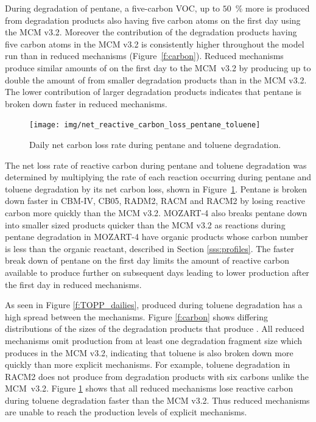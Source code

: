 During degradation of pentane, a five-carbon VOC, up to \mbox{$50$ \%} more  is produced from degradation products also having five carbon atoms on the first day using the MCM v3.2. 
Moreover the contribution of the degradation products having five carbon atoms in the MCM v3.2 is consistently higher throughout the model run than in reduced mechanisms \mbox{(Figure \ref{f:carbon}).}
Reduced mechanisms produce similar amounts of  on the first day to the \mbox{MCM v3.2} by producing up to double the amount of  from smaller degradation products than in the MCM v3.2.
The lower contribution of larger degradation products indicates that pentane is broken down faster in reduced mechanisms.

%
\begin{figure}
    \centering
    \texttt{[image: img/net\_reactive\_carbon\_loss\_pentane\_toluene]}
    \vspace{0mm}
    \caption{Daily net carbon loss rate during pentane and toluene degradation.}
    \vspace{-4mm}
    \label{f:net_carbon_loss}
\end{figure}
%
The net loss rate of reactive carbon during pentane and toluene degradation was determined by multiplying the rate of each reaction occurring during pentane and toluene degradation by its net carbon loss, shown in \mbox{Figure \ref{f:net_carbon_loss}}.
Pentane is broken down faster in CBM-IV, CB05, RADM2, RACM and RACM2 by losing reactive carbon more quickly than the MCM v3.2.
MOZART-4 also breaks pentane down into smaller sized products quicker than the MCM v3.2 as reactions during pentane degradation in MOZART-4 have organic products whose carbon number is less than the organic reactant, described in Section \ref{sss:profiles}.
The faster break down of pentane on the first day limits the amount of reactive carbon available to produce further  on subsequent days leading to lower  production after the first day in reduced mechanisms.

As seen in Figure \ref{f:TOPP_dailies},  produced during toluene degradation has a high spread between the mechanisms.
Figure \ref{f:carbon} shows differing distributions of the sizes of the degradation products that produce .
All reduced mechanisms omit  production from at least one degradation fragment size which produces  in the MCM v3.2, indicating that toluene is also broken down more quickly than more explicit mechanisms.
For example, toluene degradation in RACM2 does not produce  from degradation products with six carbons unlike the \mbox{MCM v3.2}.  
Figure \ref{f:net_carbon_loss} shows that all reduced mechanisms lose reactive carbon during toluene degradation faster than the MCM v3.2.
Thus reduced mechanisms are unable to reach the  production levels of explicit mechanisms.
